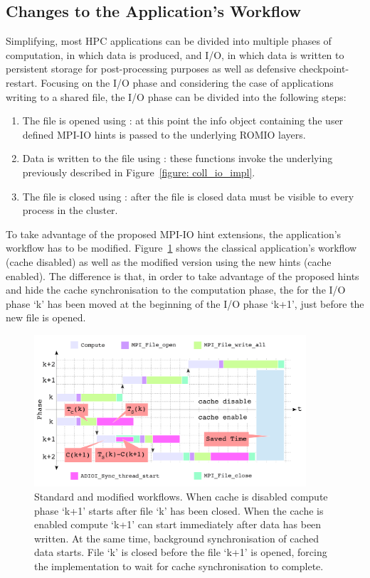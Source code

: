 \subsection{Changes to the Application's Workflow}
\label{subsec: new-workflow}
Simplifying, most HPC applications can be divided into multiple phases of computation, in which data is produced, and I/O, in which data is written to persistent storage for post-processing purposes as well as defensive checkpoint-restart. Focusing on the I/O phase and considering the case of applications writing to a shared file, the I/O phase can be divided into the following steps:
\begin{enumerate}
        \item The file is opened using : at this point the info object containing the user defined MPI-IO hints is passed to the underlying ROMIO layers.
        \item Data is written to the file using : these functions invoke the underlying  previously described in Figure~\ref{figure: coll_io_impl}.
        \item The file is closed using : after the file is closed data must be visible to every process in the cluster. 
\end{enumerate}

To take advantage of the proposed MPI-IO hint extensions, the application's workflow has to be modified. Figure~\ref{figure: workflow3} shows the classical application's workflow (cache disabled) as well as the modified version using the new hints (cache enabled). The difference is that, in order to take advantage of the proposed hints and hide the cache synchronisation to the computation phase, the  for the I/O phase `k' has been moved at the beginning of the I/O phase `k+1', just before the new file is opened.
\begin{figure}[!htb]
  \centering
  \includegraphics[width=0.9\textwidth]{chapters/chapter3/figures/workflow}
  \caption{Standard and modified workflows. When cache is disabled compute phase `k+1' starts after file `k' has been closed. When the cache is enabled compute `k+1' can start immediately after data has been written. At the same time, background synchronisation of cached data starts. File `k' is closed before the file `k+1' is opened, forcing the implementation to wait for cache synchronisation to complete.}
  \label{figure: workflow3}
\end{figure}

